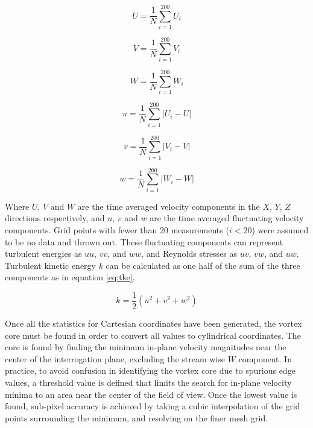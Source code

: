\begin{equation}
U  = \frac{1}{N} \sum_{i=1}^{200} U_i
\label{eq:ubar}
\end{equation}

\begin{equation}
V  = \frac{1}{N} \sum_{i=1}^{200} V_i
\end{equation}

\begin{equation}
W  = \frac{1}{N} \sum_{i=1}^{200} W_i
\end{equation}

\begin{equation}
u = \frac{1}{N} \sum_{i=1}^{200} |U_i - U|
\end{equation}

\begin{equation}
v = \frac{1}{N} \sum_{i=1}^{200} |V_i - V|
\end{equation}

\begin{equation}
w = \frac{1}{N} \sum_{i=1}^{200} |W_i - W|
\label{eq:wprime}
\end{equation}

Where $U$, $V$ and $W$ are the time averaged velocity 
components in the $X$, $Y$, $Z$ directions respectively, and  $u$, 
$v$ and $w$ are the time averaged fluctuating velocity components.
Grid points with fewer than 20 measurements ($i < 20$) were assumed to be no 
data and thrown out. These fluctuating components can represent turbulent 
energies as $uu$, $vv$, and $ww$, and Reynolds stresses as $uv$, $vw$, and 
$uw$. Turbulent kinetic energy $k$ can be calculated as one half 
of the sum of the three components as in equation \ref{eq:tke}.

\begin{equation}
k = \frac{1}{2} \left(u^2 + v^2 + w^2\right)
\label{eq:tke}
\end{equation}


Once all the statistics for Cartesian coordinates have been generated, the 
vortex core must be found in order to convert all values to cylindrical 
coordinates. The core is found by finding the minimum in-plane velocity 
magnitudes near the center of the interrogation plane, excluding the stream 
wise $W$ component. In practice, to avoid confusion in identifying the vortex 
core due to spurious edge values, a threshold value is defined that limits the 
search for in-plane velocity minima to an area near the center of the field of 
view. Once the lowest value is found, sub-pixel accuracy is achieved by taking 
a cubic interpolation of the grid points surrounding the minimum, and resolving 
on the finer mesh grid. 

